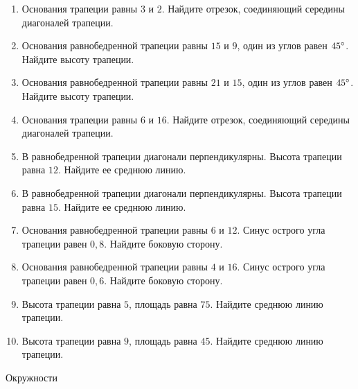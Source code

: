\documentclass[12pt, a4paper]{article}
\begin{document}
\begin{enumerate}
		\item Основания трапеции равны \( 3  \) и \( 2 \). Найдите отрезок, соединяющий середины диагоналей трапеции.
		\item Основания равнобедренной трапеции равны \( 15  \) и \( 9 \), один из углов равен \( 45  \degree\). Найдите высоту трапеции.
		\item Основания равнобедренной трапеции равны \( 21  \) и \( 15 \), один из углов равен \( 45  \degree\). Найдите высоту трапеции.
		\item Основания трапеции равны \( 6  \) и \( 16 \). Найдите отрезок, соединяющий середины диагоналей трапеции.
		\item В равнобедренной трапеции диагонали перпендикулярны. Высота трапеции равна \( 12 \). Найдите ее среднюю линию.
		\item В равнобедренной трапеции диагонали перпендикулярны. Высота трапеции равна \( 15 \). Найдите ее среднюю линию.
		\item Основания равнобедренной трапеции равны \( 6  \) и \( 12 \). Синус острого угла трапеции равен \( 0,8 \). Найдите боковую сторону.
		\item Основания равнобедренной трапеции равны \( 4 \)  и \( 16 \). Синус острого угла трапеции равен \( 0,6 \). Найдите боковую сторону.
		\item Высота трапеции равна \( 5 \), площадь равна \( 75 \). Найдите среднюю линию трапеции.
		\item Высота трапеции равна \( 9 \), площадь равна \( 45 \). Найдите среднюю линию трапеции.
	\end{enumerate}
		Окружности
\end{document}
